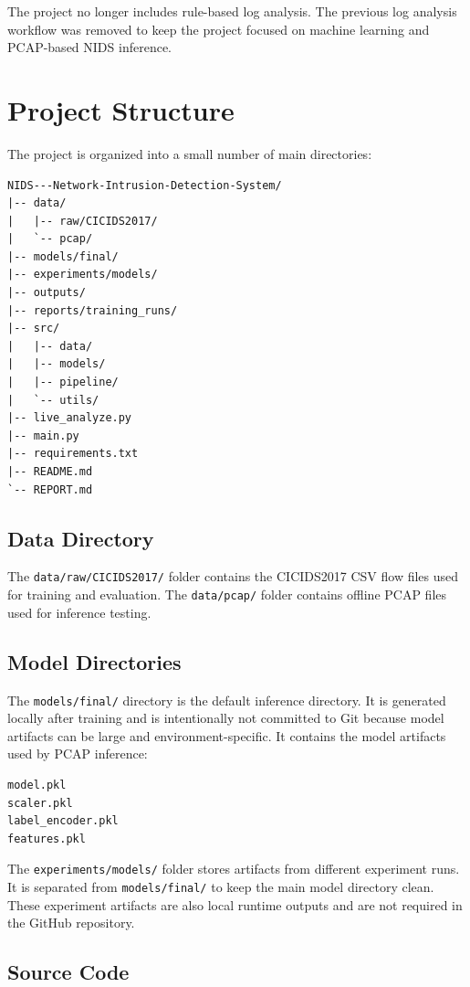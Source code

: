\documentclass[12pt,a4paper]{article}
\begin{document}
The project no longer includes rule-based log analysis. The previous log analysis workflow was removed to keep the project focused on machine learning and PCAP-based NIDS inference.

\section{Project Structure}

The project is organized into a small number of main directories:

\begin{lstlisting}
NIDS---Network-Intrusion-Detection-System/
|-- data/
|   |-- raw/CICIDS2017/
|   `-- pcap/
|-- models/final/
|-- experiments/models/
|-- outputs/
|-- reports/training_runs/
|-- src/
|   |-- data/
|   |-- models/
|   |-- pipeline/
|   `-- utils/
|-- live_analyze.py
|-- main.py
|-- requirements.txt
|-- README.md
`-- REPORT.md
\end{lstlisting}

\subsection{Data Directory}

The \texttt{data/raw/CICIDS2017/} folder contains the CICIDS2017 CSV flow files used for training and evaluation. The \texttt{data/pcap/} folder contains offline PCAP files used for inference testing.

\subsection{Model Directories}

The \texttt{models/final/} directory is the default inference directory. It is generated locally after training and is intentionally not committed to Git because model artifacts can be large and environment-specific. It contains the model artifacts used by PCAP inference:

\begin{lstlisting}
model.pkl
scaler.pkl
label_encoder.pkl
features.pkl
\end{lstlisting}

The \texttt{experiments/models/} folder stores artifacts from different experiment runs. It is separated from \texttt{models/final/} to keep the main model directory clean. These experiment artifacts are also local runtime outputs and are not required in the GitHub repository.

\subsection{Source Code}
\end{document}
